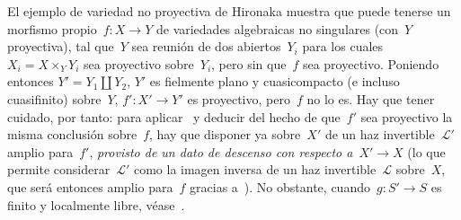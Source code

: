 \begin{remarques}
\label{VIII.5.10}
El ejemplo de variedad no proyectiva de Hironaka muestra que puede tenerse
un morfismo propio~$f\colon X\to Y$ de variedades algebraicas no singulares
(con~$Y$ proyectiva), tal que~$Y$ sea reunión de dos abiertos~$Y_{i}$ para
los cuales~$X_{i}=X\times_{Y}Y_{i}$ sea proyectivo sobre~$Y_{i}$, pero sin
que~$f$ sea proyectivo. Poniendo entonces $Y'=Y_{1}\amalg Y_{2}$, $Y'$ es
fielmente plano y cuasicompacto (e incluso cuasifinito) sobre~$Y$,
$f'\colon X'\to Y'$ es proyectivo, pero~$f$ no lo es. Hay que tener
cuidado, por tanto: para aplicar~ y deducir del hecho de
que~$f'$ sea proyectivo la misma conclusión sobre~$f$, hay que disponer ya
sobre~$X'$ de un haz invertible~$\mathcal{L}'$ amplio para~$f'$,
\emph{provisto de un dato de descenso con respecto a}~$X'\to X$ (lo que
permite considerar~$\mathcal{L}'$ como la imagen inversa de un haz
invertible~$\mathcal{L}$ sobre~$X$, que será entonces amplio para~$f$
gracias a~). No obstante, cuando~$g\colon S'\to S$ es finito
y localmente libre, véase~.
\end{remarques}
